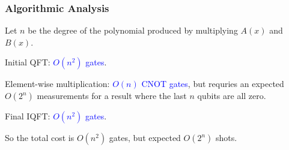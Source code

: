 \documentclass[
	11pt, %
]{beamer}
\begin{document}


\begin{frame}
    \frametitle{Algorithmic Analysis}
    Let $n$ be the degree of the polynomial produced by multiplying $A(x)$ and $B(x)$.

    \bigskip
    Initial QFT: \textcolor{blue}{$O(n^2)$ gates}.

    \bigskip
    Element-wise multiplication: \textcolor{blue}{$O(n)$ CNOT gates}, 
    but requries an expected $O(2^n)$ measurements for a result where 
    the last $n$ qubits are all zero.

    \bigskip
    Final IQFT: \textcolor{blue}{$O(n^2)$ gates}.

    \bigskip
    So the total cost is $O(n^2)$ gates, but expected $O(2^n)$ shots.
\end{frame}

\end{document}
